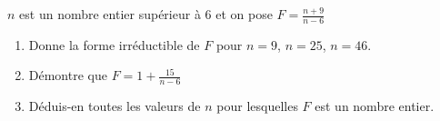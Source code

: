 
$n$ est un nombre entier supérieur à 6 et on pose
$F=\frac{n+9}{n-6}$
\begin{enumerate}
\item Donne la forme irréductible de $F$ pour $n=9$, $n=25$, $n=46$.
\item Démontre que
$F=1+\frac{15}{n-6}$
\item Déduis-en toutes les valeurs de $n$ pour lesquelles $F$ est un
nombre entier.
\end{enumerate}

